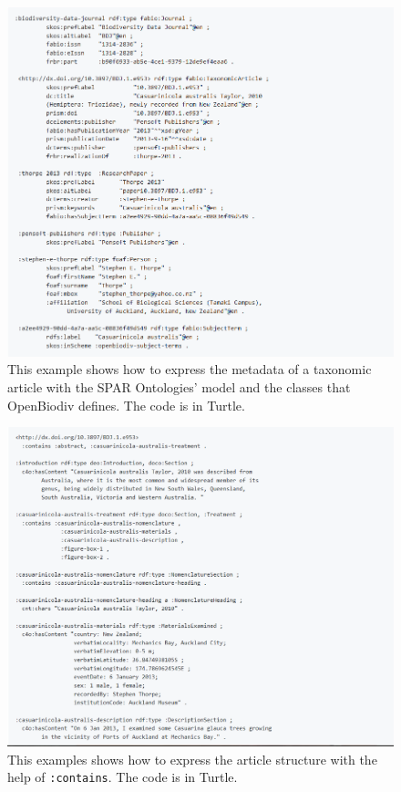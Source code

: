 \begin{figure}[h!]
	\centering
	\includegraphics[width=\textwidth]{Figures/example-article-metadata}
	\decoRule
  \caption[Example article metadata.]{This example shows how to express the metadata of a taxonomic article with the SPAR Ontologies' model and the classes that OpenBiodiv defines. The code is in Turtle.}
  \label{example-article-metadata}
\end{figure}

\begin{figure}[h!]
  \centering
  \includegraphics[width=\textwidth]{Figures/example-article-structure}
  \decoRule
  \caption[Example article structure.]{This examples shows how to express the article structure with the help of {\tt :contains}. The code is in Turtle.}
  \label{example-article-structure}
\end{figure}


